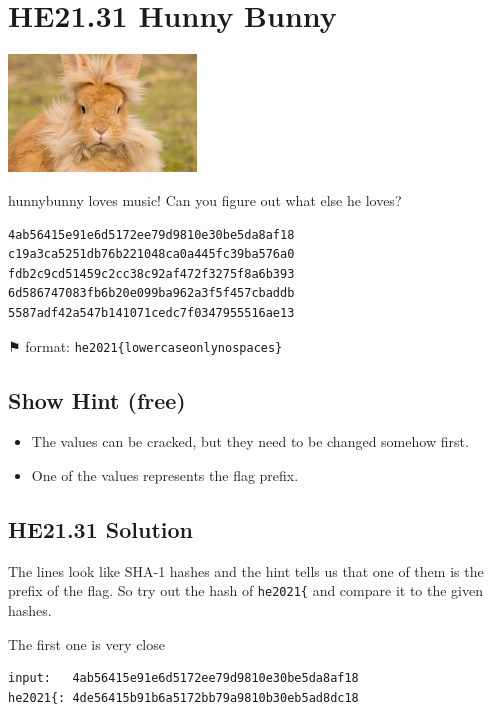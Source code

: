 \documentclass[english,a4paper,nols,noindent]{tufte-handout}
\begin{document}
\hypertarget{he21.31}{%
\section{HE21.31 Hunny Bunny}
  \label{he21.31}}
\begin{marginfigure}
    \includegraphics[width=50mm]{images/challenge31.jpg}
\end{marginfigure}

\noindent hunnybunny loves music! Can you figure out what else he loves?

\begin{verbatim}
4ab56415e91e6d5172ee79d9810e30be5da8af18
c19a3ca5251db76b221048ca0a445fc39ba576a0
fdb2c9cd51459c2cc38c92af472f3275f8a6b393
6d586747083fb6b20e099ba962a3f5f457cbaddb
5587adf42a547b141071cedc7f0347955516ae13
\end{verbatim}

⚑ format: \verb+he2021{lowercaseonlynospaces}+

\subsection{Show Hint (free)}
\begin{itemize}
\item The values can be cracked, but they need to be changed somehow first.
\item One of the values represents the flag prefix.
\end{itemize}

\hypertarget{he21.31-solution}{%
\subsection{HE21.31 Solution}\label{he21.31-solution}}

\noindent The lines look like SHA-1 hashes and the hint tells us that one of
them is the prefix of the flag.  So try out the hash of \verb+he2021{+ and
compare it to the given hashes.

The first one is very close

\begin{verbatim} 
input:   4ab56415e91e6d5172ee79d9810e30be5da8af18
he2021{: 4de56415b91b6a5172bb79a9810b30eb5ad8dc18
\end{verbatim} 
\end{document}
